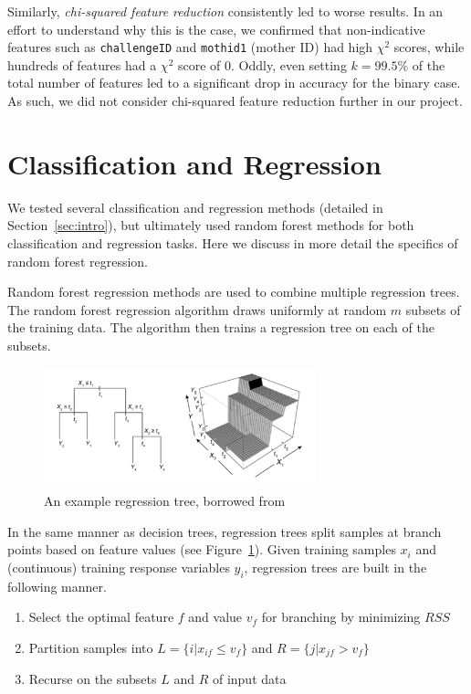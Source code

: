 \documentclass{article} %
\begin{document}
Similarly, \textit{chi-squared feature reduction} consistently led to worse results. In an effort to understand why this is the case, we confirmed that non-indicative features such as \texttt{challengeID} and \texttt{mothid1} (mother ID) had high $\chi^2$ scores, while hundreds of features had a $\chi^2$ score of 0. Oddly, even setting $k = 99.5\%$ of the total number of features led to a significant drop in accuracy for the binary case. 
As such, we did not consider chi-squared feature reduction further in our project.

\section{Classification and Regression}
\label{sec:regression}

We tested several classification and regression methods (detailed in Section~\ref{sec:intro}), but ultimately used random forest methods for both classification and regression tasks. Here we discuss in more detail the specifics of random forest regression.

Random forest \cite{randomforest} regression methods are used to combine multiple regression trees. The random forest regression algorithm draws uniformly at random $m$ subsets of the training data. The algorithm then trains a regression tree on each of the subsets.

\begin{figure}[H]
  \centering
  \includegraphics[width=0.7\textwidth]{rf.png}
  \caption{An example regression tree, borrowed from \cite{rffig}}
  \label{fig:regtree}
\end{figure}

In the same manner as decision trees, regression trees split samples at branch points based on feature values (see Figure~\ref{fig:regtree}). Given training samples $x_i$ and (continuous) training response variables $y_i$, regression trees are built in the following manner.

\begin{enumerate}
  \item Select the optimal feature $f$ and value $v_f$ for branching by minimizing $RSS$
  \item Partition samples into $L = \{i | x_{if} \leq v_f\}$ and $R = \{j | x_{jf} > v_f\}$
  \item Recurse on the subsets $L$ and $R$ of input data
\end{enumerate}
\end{document}
